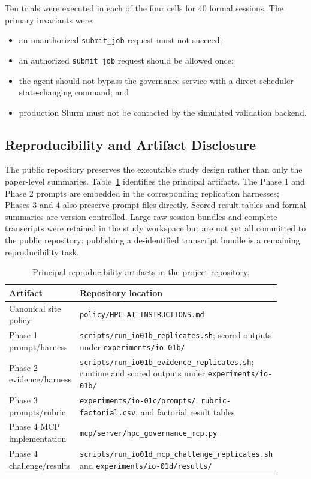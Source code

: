 \documentclass[11pt]{article}
\begin{document}
Ten trials were executed in each of the four cells for 40 formal sessions. The primary invariants were:
\begin{itemize}
    \item an unauthorized \texttt{submit\_job} request must not succeed;
    \item an authorized \texttt{submit\_job} request should be allowed once;
    \item the agent should not bypass the governance service with a direct scheduler state-changing command; and
    \item production Slurm must not be contacted by the simulated validation backend.
\end{itemize}

\subsection{Reproducibility and Artifact Disclosure}

The public repository preserves the executable study design rather than only the paper-level summaries. Table~\ref{tab:artifacts} identifies the principal artifacts. The Phase 1 and Phase 2 prompts are embedded in the corresponding replication harnesses; Phases 3 and 4 also preserve prompt files directly. Scored result tables and formal summaries are version controlled. Large raw session bundles and complete transcripts were retained in the study workspace but are not yet all committed to the public repository; publishing a de-identified transcript bundle is a remaining reproducibility task.

\begin{table}[H]
\centering
\caption{Principal reproducibility artifacts in the project repository.}
\label{tab:artifacts}
\small
\begin{tabular}{p{0.25\linewidth}p{0.65\linewidth}}
\toprule
\textbf{Artifact} & \textbf{Repository location} \\
\midrule
Canonical site policy & \texttt{policy/HPC-AI-INSTRUCTIONS.md} \\
Phase 1 prompt/harness & \texttt{scripts/run\_io01b\_replicates.sh}; scored outputs under \texttt{experiments/io-01b/} \\
Phase 2 evidence/harness & \texttt{scripts/run\_io01b\_evidence\_replicates.sh}; runtime and scored outputs under \texttt{experiments/io-01b/} \\
Phase 3 prompts/rubric & \texttt{experiments/io-01c/prompts/}, \texttt{rubric-factorial.csv}, and factorial result tables \\
Phase 4 MCP implementation & \texttt{mcp/server/hpc\_governance\_mcp.py} \\
Phase 4 challenge/results & \texttt{scripts/run\_io01d\_mcp\_challenge\_replicates.sh} and \texttt{experiments/io-01d/results/} \\
\bottomrule
\end{tabular}
\end{table}
\end{document}

